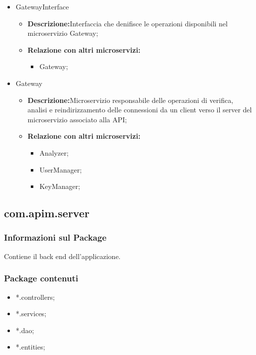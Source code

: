 {\begin{itemize}
\begin{itemize}
    \item \textbf{Relazione con altri microservizi:}
  \end{itemize}
\item GatewayInterface
  \begin{itemize}
  \item \textbf{Descrizione:}Interfaccia che denifisce le operazioni disponibili nel microservizio Gateway;
    \item \textbf{Relazione con altri microservizi:}
      \begin{itemize}
      \item Gateway;
      \end{itemize}
  \end{itemize}
\item Gateway
  \begin{itemize}
  \item \textbf{Descrizione:}Microservizio responsabile delle operazioni di verifica, analisi e reindirizzamento delle connessioni da un client verso il server del microservizio associato alla API;
    \item \textbf{Relazione con altri microservizi:}
      \begin{itemize}
      \item Analyzer;
        \item UserManager;
        \item KeyManager;
      \end{itemize}
  \end{itemize}

\end{itemize}

  \subsection{com.apim.server}{
    \subsubsection{Informazioni sul Package}
        Contiene il back end dell'applicazione.
        \subsubsection{Package contenuti}
        \begin{itemize} \itemsep1pt
        \item *.controllers;
        \item *.services;
        \item *.dao;
        \item *.entities;
        \end{itemize}
}}
